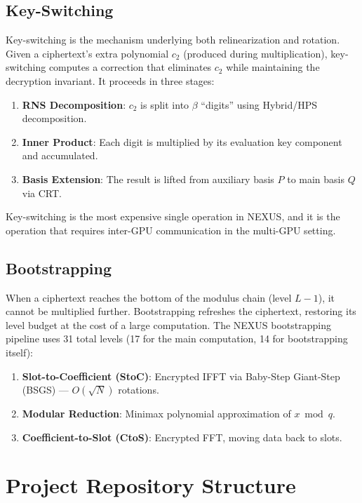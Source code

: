 \documentclass[11pt,letterpaper]{article}
\begin{document}
\subsection{Key-Switching}

Key-switching is the mechanism underlying both relinearization and rotation. Given a
ciphertext's extra polynomial $c_2$ (produced during multiplication), key-switching computes
a correction that eliminates $c_2$ while maintaining the decryption invariant. It proceeds
in three stages:

\begin{enumerate}
  \item \textbf{RNS Decomposition}: $c_2$ is split into $\beta$ ``digits'' using Hybrid/HPS decomposition.
  \item \textbf{Inner Product}: Each digit is multiplied by its evaluation key component and accumulated.
  \item \textbf{Basis Extension}: The result is lifted from auxiliary basis $P$ to main basis $Q$ via CRT.
\end{enumerate}

Key-switching is the most expensive single operation in NEXUS, and it is the operation that
requires inter-GPU communication in the multi-GPU setting.

\subsection{Bootstrapping}

When a ciphertext reaches the bottom of the modulus chain (level $L-1$), it cannot be
multiplied further. Bootstrapping refreshes the ciphertext, restoring its level budget at the
cost of a large computation. The NEXUS bootstrapping pipeline uses 31 total levels (17 for
the main computation, 14 for bootstrapping itself):

\begin{enumerate}
  \item \textbf{Slot-to-Coefficient (StoC)}: Encrypted IFFT via Baby-Step Giant-Step (BSGS) --- $O(\sqrt{N})$ rotations.
  \item \textbf{Modular Reduction}: Minimax polynomial approximation of $x \bmod q$.
  \item \textbf{Coefficient-to-Slot (CtoS)}: Encrypted FFT, moving data back to slots.
\end{enumerate}

\section{Project Repository Structure}
\label{sec:structure}
\end{document}
